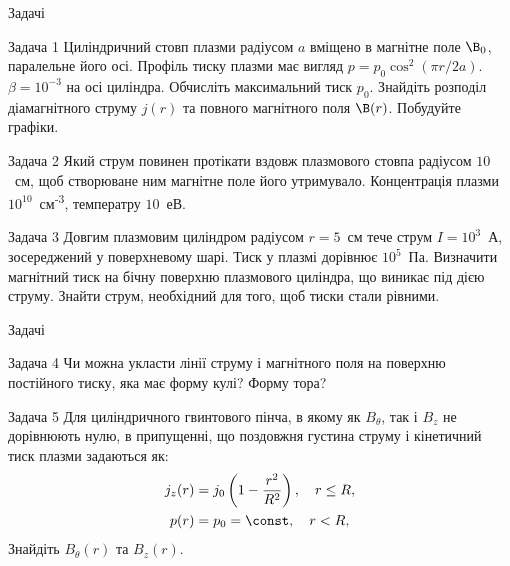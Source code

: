\documentclass[]{beamer}
\begin{document}
\begin{frame}{Задачі}{}
	\begin{exampleblock}{Задача 1}\justifying
		Циліндричний стовп плазми радіусом $a$ вміщено в магнітне поле
		$\B_0$, паралельне його осі. Профіль тиску плазми має вигляд $p = p_0\cos^2(\pi r/2a)$. $\beta = 10^{-3}$ на осі циліндра.
		Обчисліть максимальний тиск $p_0$. Знайдіть розподіл діамагнітного струму $j(r)$ та повного магнітного поля $\B(r)$. Побудуйте графіки.
	\end{exampleblock}
	\begin{exampleblock}{Задача 2}\justifying
		Який струм повинен протікати вздовж плазмового стовпа радіусом $10$~см, щоб створюване ним магнітне поле його утримувало. Концентрація плазми$10^{10}$~см\textsuperscript{-3}, температру $10$~еВ.
	\end{exampleblock}
	\begin{exampleblock}{Задача 3}
		Довгим плазмовим циліндром радіусом $r = 5$~см тече струм $ I = 10^3$~А, зосереджений у поверхневому шарі. Тиск у плазмі дорівнює $10^5$~Па. Визначити магнітний тиск  на бічну поверхню плазмового циліндра, що виникає під дією струму. Знайти струм, необхідний для того, щоб тиски стали рівними.
	\end{exampleblock}
\end{frame}

\begin{frame}{Задачі}
	\begin{exampleblock}{Задача 4}\justifying
		Чи можна укласти лінії струму і магнітного поля на поверхню постійного тиску, яка має форму кулі? Форму тора?
	\end{exampleblock}
	\begin{exampleblock}{Задача 5}\justifying
		Для циліндричного гвинтового пінча, в якому як $B_{\theta}$, так і $B_z$ не дорівнюють нулю, в припущенні, що поздовжня густина струму і кінетичний тиск плазми задаються як:
		\begin{align*}
			j_z(r) & = j_0\left(1 - \frac{r^2}{R^2}\right), \quad r\le R, \\
			p(r)   & = p_0 = \const, \quad r < R,
		\end{align*}
		Знайдіть $B_{\theta}(r)$ та $B_z(r)$.
	\end{exampleblock}
\end{frame}
\end{document}
